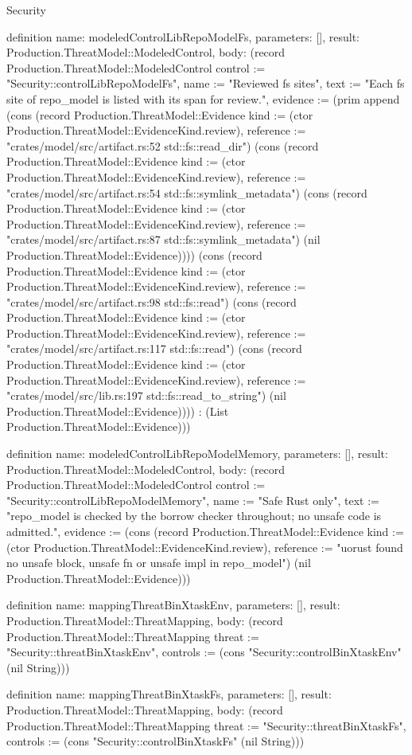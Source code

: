 \begin{lexlean}{Security}
\begin{semanticmodule}
definition{
  name: modeledControlLibRepoModelFs,
  parameters: [],
  result: Production.ThreatModel::ModeledControl,
  body: (record Production.ThreatModel::ModeledControl {control := "Security::controlLibRepoModelFs", name := "Reviewed fs sites", text := "Each fs site of repo_model is listed with its span for review.", evidence := (prim append (cons (record Production.ThreatModel::Evidence {kind := (ctor Production.ThreatModel::EvidenceKind.review), reference := "crates/model/src/artifact.rs:52 std::fs::read_dir"}) (cons (record Production.ThreatModel::Evidence {kind := (ctor Production.ThreatModel::EvidenceKind.review), reference := "crates/model/src/artifact.rs:54 std::fs::symlink_metadata"}) (cons (record Production.ThreatModel::Evidence {kind := (ctor Production.ThreatModel::EvidenceKind.review), reference := "crates/model/src/artifact.rs:87 std::fs::symlink_metadata"}) (nil Production.ThreatModel::Evidence)))) (cons (record Production.ThreatModel::Evidence {kind := (ctor Production.ThreatModel::EvidenceKind.review), reference := "crates/model/src/artifact.rs:98 std::fs::read"}) (cons (record Production.ThreatModel::Evidence {kind := (ctor Production.ThreatModel::EvidenceKind.review), reference := "crates/model/src/artifact.rs:117 std::fs::read"}) (cons (record Production.ThreatModel::Evidence {kind := (ctor Production.ThreatModel::EvidenceKind.review), reference := "crates/model/src/lib.rs:197 std::fs::read_to_string"}) (nil Production.ThreatModel::Evidence)))) : (List Production.ThreatModel::Evidence))})
}

definition{
  name: modeledControlLibRepoModelMemory,
  parameters: [],
  result: Production.ThreatModel::ModeledControl,
  body: (record Production.ThreatModel::ModeledControl {control := "Security::controlLibRepoModelMemory", name := "Safe Rust only", text := "repo_model is checked by the borrow checker throughout; no unsafe code is admitted.", evidence := (cons (record Production.ThreatModel::Evidence {kind := (ctor Production.ThreatModel::EvidenceKind.review), reference := "uorust found no unsafe block, unsafe fn or unsafe impl in repo_model"}) (nil Production.ThreatModel::Evidence))})
}

definition{
  name: mappingThreatBinXtaskEnv,
  parameters: [],
  result: Production.ThreatModel::ThreatMapping,
  body: (record Production.ThreatModel::ThreatMapping {threat := "Security::threatBinXtaskEnv", controls := (cons "Security::controlBinXtaskEnv" (nil String))})
}

definition{
  name: mappingThreatBinXtaskFs,
  parameters: [],
  result: Production.ThreatModel::ThreatMapping,
  body: (record Production.ThreatModel::ThreatMapping {threat := "Security::threatBinXtaskFs", controls := (cons "Security::controlBinXtaskFs" (nil String))})
}


\end{semanticmodule}
\end{lexlean}
